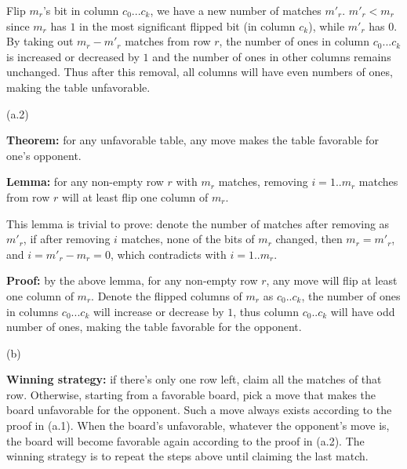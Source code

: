 \documentclass{article}
\begin{document}
\begin{description}
  Flip $m_r$'s bit in column $c_0...c_k$, we have a new number of matches $m'_r$. $m'_r < m_r$ since $m_r$ has $1$ in the most significant flipped bit (in column $c_k$), while $m'_r$ has $0$. By taking out $m_r - m'_r$ matches from row $r$, the number of ones in column $c_0...c_k$ is increased or decreased by $1$ and the number of ones in other columns remains unchanged. Thus after this removal, all columns will have even numbers of ones, making the table unfavorable.

  (a.2) 

  \textbf{Theorem:} for any unfavorable table, any move makes the table favorable for one’s opponent.

  \textbf{Lemma:} for any non-empty row $r$ with $m_r$ matches, removing $i=1..m_r$ matches from row $r$ will at least flip one column of $m_r$. 

  This lemma is trivial to prove: denote the number of matches after removing as $m'_r$, if after removing $i$ matches, none of the bits of $m_r$ changed, then $m_r = m'_r$, and $i = m'_r - m_r = 0$, which contradicts with $i=1..m_r$.

  \textbf{Proof:} by the above lemma, for any non-empty row $r$, any move will flip at least one column of $m_r$. Denote the flipped columns of $m_r$ as $c_0..c_k$, the number of ones in columns $c_0...c_k$ will increase or decrease by $1$, thus column $c_0..c_k$ will have odd number of ones, making the table favorable for the opponent.

  (b) 

  \textbf{Winning strategy:} if there's only one row left, claim all the matches of that row. Otherwise, starting from a favorable board, pick a move that makes the board unfavorable for the opponent. Such a move always exists according to the proof in (a.1). When the board's unfavorable, whatever the opponent's move is, the board will become favorable again according to the proof in (a.2). The winning strategy is to repeat the steps above until claiming the last match.

\end{description}
\end{document}
